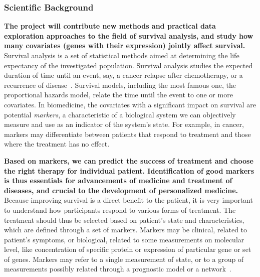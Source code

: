 \documentclass[11pt,a4paper]{article}
\renewcommand{\bold}{\textbf}
\begin{document}
\subsubsection*{Scientific Background}

\bold{The project will contribute new methods and practical data exploration approaches to the field of survival analysis, and study how many covariates (genes with their expression) jointly affect survival.} Survival analysis is a set of statistical methods aimed at determining the life expectancy of the investigated population. Survival analysis studies the expected duration of time until an event, say, a cancer relapse after chemotherapy, or a recurrence of disease~\cite{pazdur2008endpoints}. Survival models, including the most famous one, the proportional hazards model, relate the time until the event to one or more covariates. In biomedicine, the covariates with a significant impact on survival are potential {\em markers}, a characteristic of a biological system we can objectively measure and use as an indicator of the system's state. For example, in cancer, markers may differentiate between patients that respond to treatment and those where the treatment has no effect. 

\bold{ Based on markers, we can predict the success of treatment and choose the right therapy for individual patient. Identification of good markers is thus essentials for advancements of medicine and treatment of diseases, and crucial to the development of personalized medicine.} Because improving survival is a direct benefit to the patient, it is very important to understand how participants respond to various forms of treatment. The treatment should thus be selected based on patient's state and characteristics, which are defined through a set of markers. Markers may be clinical, related to patient's symptoms, or biological, related to some measurements on molecular level, like concentration of specific protein or expression of particular gene or set of genes. Markers may refer to a single measurement of state, or to a group of measurements possibly related through a prognostic model or a network~\cite{Sonawane2019}.
\end{document}

